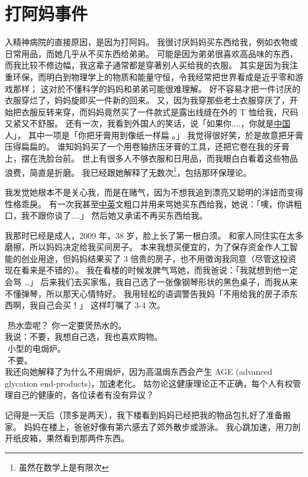 \documentclass[12pt]{report}
\newcommand{\tab}{\hspace*{1cm}}
\newcommand*\dashh{\textemdash\,\,}
\begin{document}
\chapter{打阿妈事件}

入精神病院的直接原因，是因为打阿妈。 我很讨厌妈妈买东西给我，例如衣物或日常用品，而她几乎从不买东西给弟弟。 可能是因为弟弟很喜欢高品味的东西，而我比较不修边幅，我这辈子通常都是穿著别人买给我的衣服。 其实是因为我注重环保，而明白到物理学上的物质和能量守恒，令我经常把世界看成是近乎零和游戏那样； 这对於不懂科学的妈妈和弟弟可能很难理解。 好不容易才把一件讨厌的衣服穿烂了，妈妈旋即买一件新的回来。 又，因为我穿那些老土衣服穿厌了，开始把衣服反转来穿，而妈妈竟然买了一件款式是露出线缝在外的 T 恤给我，尺码又紧又不舒服。 还有一次，我看到外国人的笑话，说「如果你....，你就是\uline{中国}人」， 其中一项是「你把牙膏用到像纸一样扁 。」 我觉得很好笑，於是故意把牙膏压得扁扁的。 谁知妈妈买了一个用卷轴挤压牙膏的工具，还把它卷在我的牙膏上，摆在洗脸台前。 世上有很多人不够衣服和日用品，而我眼白白看着这些物品浪费，简直是折磨。 我已经跟她解释了无数次\footnote{虽然在数学上是有限次}，包括那环保理论。

我发觉她根本不是关心我，而是在赌气，因为不想我追到漂亮又聪明的洋妞而变得性格乖戾。 有一次我甚至\uline{中英}文粗口并用来骂她买东西给我，她说：「噢，你讲粗口，我不跟你谈了....」 然后她又承诺不再买东西给我。

我那时已经是成人，2009 年，38 岁，脸上长了第一根白须。 和家人同住实在太多磨擦，所以妈妈决定给我买间房子。 本来我想买便宜的，为了保存资金作人工智能的创业用途，但妈妈结果买了 3 倍贵的房子，也不用徵询我同意（尽管这投资现在看来是不错的）。 我在看楼的时候发脾气骂她，而我爸说：「我就想到他一定会骂 …」 后来我们去买家俬，我自己选了一张像钢琴形状的黑色桌子，而我从来不懂弹琴，所以那天心情特好。 我用轻松的语调警告我妈「不用给我的房子添东西啊，我自己会买！」 这样叮嘱了 3-4 次。

\tab \dashh 热水壶呢？ 你一定要煲热水的。\\
\tab 我说：不要，我想自己选，我也喜欢购物。\\
\tab \dashh 小型的电焗炉。\\
\tab \dashh 不要。\\
我还向她解释了为什么不用焗炉，因为高温焗东西会产生 AGE (advanced glycation end-products)，加速老化。 姑勿论这健康理论正不正确，每个人有权管理自己的健康的，各位读者有没有异议？

记得是一天后（顶多是两天），我下楼看到妈妈已经把我的物品包扎好了准备搬家。 妈妈在楼上，爸爸好像有第六感去了郊外散步或游泳。 我心跳加速，用刀剖开纸皮箱，果然看到那两件东西。
\end{document}

